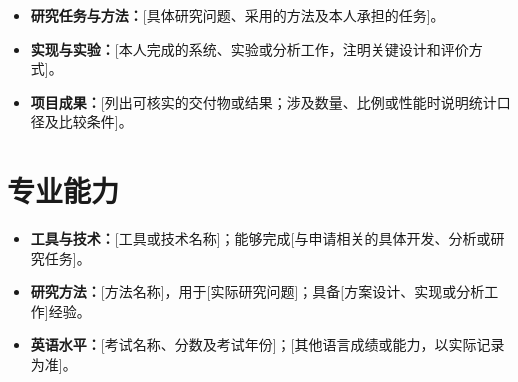 \documentclass[chinese]{academic-cv}
\begin{document}
\internshipentry{[单位名称]}{[部门／团队／岗位]}{[起止年月]}
\begin{itemize}
  \item \textbf{研究任务与方法：}[具体研究问题、采用的方法及本人承担的任务]。
  \item \textbf{实现与实验：}[本人完成的系统、实验或分析工作，注明关键设计和评价方式]。
  \item \textbf{项目成果：}[列出可核实的交付物或结果；涉及数量、比例或性能时说明统计口径及比较条件]。
\end{itemize}

\section{专业能力}

\begin{itemize}
  \item \textbf{工具与技术：}[工具或技术名称]；能够完成[与申请相关的具体开发、分析或研究任务]。
  \item \textbf{研究方法：}[方法名称]，用于[实际研究问题]；具备[方案设计、实现或分析工作]经验。
  \item \textbf{英语水平：}[考试名称、分数及考试年份]；[其他语言成绩或能力，以实际记录为准]。
\end{itemize}


\end{document}
